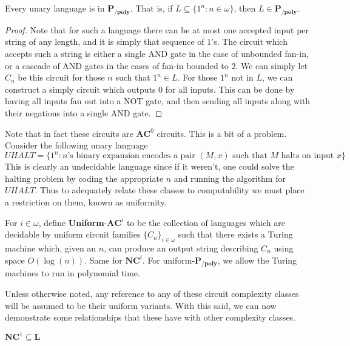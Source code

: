 \begin{fact}
	Every unary language is in $\bm{P_{/poly}}$. That is, if $L \subseteq \{1^n: n \in \omega\}$, then $L \in \bm{P_{/poly}}$. 
\end{fact}
\begin{proof}
	Note that for such a language there can be at most one accepted input per string of any length, and it is simply that sequence of $1$'s. The circuit which accepts such a string is either a single AND gate in the case of unbounded fan-in, or a cascade of AND gates in the cases of fan-in bounded to $2$. We can simply let $C_n$ be this circuit for those $n$ such that $1^n \in L$. For those $1^n$ not in $L$, we can construct a simply circuit which outputs $0$ for all inputs. This can be done by having all inputs fan out into a NOT gate, and then sending all inputs along with their negations into a single AND gate. 
\end{proof}
Note that in fact these circuits are $\bm{AC}^0$ circuits. This is a bit of a problem. Consider the following unary language
\[ UHALT = \{1^n: n\textrm{'s binary expansion encodes a pair $(M,x)$ such that $M$ halts on input $x$}\}  \]
This is clearly an undecidable language since if it weren't, one could solve the halting problem by coding the appropriate $n$ and running the algorithm for $UHALT$. Thus to adequately relate these classes to computability we must place a restriction on them, known as uniformity. 
\begin{definition}
	For $i \in \omega$, define \textbf{Uniform}-$\bm{AC}^i$ to be the collection of languages which are decidable by uniform circuit families $\{C_n\}_{i \in \omega}$ such that there exists a Turing machine which, given an $n$, can produce an output string describing $C_n$ using space $O(\log(n))$. Same for $\bm{NC}^i$. For uniform-$\bm{P_{/poly}}$, we allow the Turing machines to run in polynomial time. 
\end{definition}
Unless otherwise noted, any reference to any of these circuit complexity classes will be assumed to be their uniform variants. With this said, we can now demonstrate some relationships that these have with other complexity classes. 
\begin{fact}
	$\bm{NC}^1 \subseteq \bm{L}$
\end{fact}
